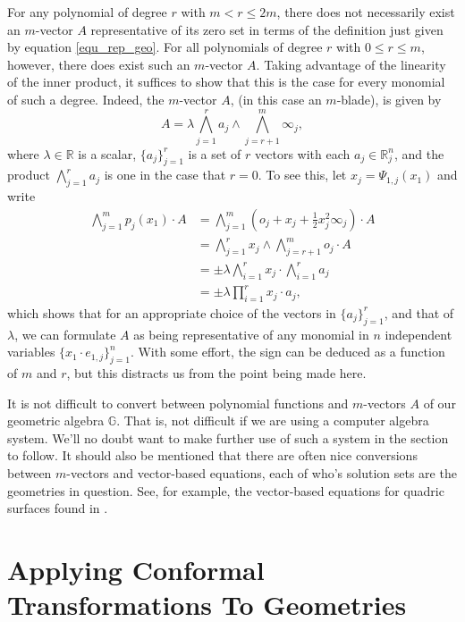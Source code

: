 \documentclass{ecgd-l}
\theoremstyle{definition}
\theoremstyle{remark}
\numberwithin{equation}{section}
\newcommand{\G}{\mathbb{G}}
\newcommand{\R}{\mathbb{R}}
\newcommand{\nvai}{\infty}
\newcommand{\nvao}{o}
\begin{document}
For any polynomial of degree $r$ with $m<r\leq 2m$, there does not necessarily exist an $m$-vector $A$ representative of its zero set in terms of the definition just given by
equation \eqref{equ_rep_geo}.  For all polynomials of degree $r$ with $0\leq r\leq m$,
however,
there does exist such an $m$-vector $A$.  Taking advantage of the linearity of the inner product,
it suffices to show that this is the case for every monomial of such a degree.  Indeed, the $m$-vector
$A$, (in this case an $m$-blade), is given by
\begin{equation*}
A = \lambda\bigwedge_{j=1}^r a_j\wedge\bigwedge_{j=r+1}^m\nvai_j,
\end{equation*}
where $\lambda\in\R$ is a scalar, $\{a_j\}_{j=1}^r$ is a set of $r$ vectors with
each $a_j\in\R^n_j$,
and the product $\bigwedge_{j=1}^r a_j$ is one in the case that $r=0$.
To see this, let $x_j=\Psi_{1,j}(x_1)$ and write
\begin{align*}
\bigwedge_{j=1}^m p_j(x_1)\cdot A
 &= \bigwedge_{j=1}^m\left(\nvao_j+x_j+\frac{1}{2}x_j^2\nvai_j\right)\cdot A \\
 &= \bigwedge_{j=1}^r x_j\wedge\bigwedge_{j=r+1}^m\nvao_j\cdot A \\
 &= \pm\lambda\bigwedge_{i=1}^r x_j \cdot\bigwedge_{i=1}^r a_j \\
 &= \pm\lambda\prod_{i=1}^r x_j\cdot a_j,
\end{align*}
which shows that for an appropriate choice of the vectors in $\{a_j\}_{j=1}^r$,
and that of $\lambda$, we can formulate $A$ as being representative of any monomial in $n$
independent variables $\{x_1\cdot e_{1,j}\}_{j=1}^n$.  With some effort,
the sign can be deduced as a function of $m$ and $r$, but this distracts us
from the point being made here.

It is not difficult to convert between polynomial functions and $m$-vectors $A$
of our geometric algebra $\G$.  That is, not difficult if we are using a computer
algebra system.  We'll no doubt want to make further
use of such a system in the section to follow.  It should also be mentioned
that there are often nice conversions between $m$-vectors and vector-based
equations, each of who's solution sets are the geometries in question.  See, for example,
the vector-based equations for quadric surfaces found in \cite{Miller87}.

\section{Applying Conformal Transformations To Geometries}
\end{document}
